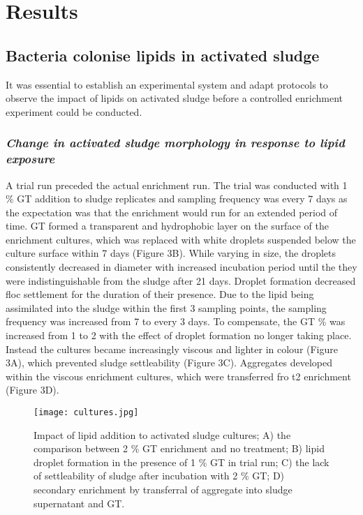 \documentclass{article}
\begin{document}
\newpage
\section{Results}

\subsection{Bacteria colonise lipids in activated sludge}
It was essential to establish an experimental system and adapt protocols to observe the impact of lipids on activated sludge before a controlled enrichment experiment could be conducted. 

\subsubsection{\emph{Change in activated sludge morphology in response to lipid exposure}}
A trial run preceded the actual enrichment run. The trial was conducted with 1 \% GT  addition to sludge replicates and sampling frequency was every 7 days as the expectation was that the enrichment would run for an extended period of time. GT formed a transparent and hydrophobic layer on the surface of the enrichment cultures, which was replaced with white droplets suspended below the culture surface within 7 days (Figure 3B). While varying in size, the droplets consistently decreased in diameter with increased incubation period until the they were indistinguishable from the sludge after 21 days. Droplet formation decreased floc settlement for the duration of their presence. 
Due to the lipid being assimilated into the sludge within the first 3 sampling points, the sampling frequency was increased from 7 to every 3 days. To compensate, the GT \% was increased from 1 to 2 with the effect of droplet formation no longer taking place. Instead the cultures became increasingly viscous and lighter in colour (Figure 3A), which prevented sludge settleability (Figure 3C). Aggregates developed within the viscous enrichment cultures, which were transferred fro t2 enrichment (Figure 3D).  
\begin{figure}
\texttt{[image: cultures.jpg]}
\caption{Impact of lipid addition to activated sludge cultures; A) the comparison between 2 \% GT enrichment and no treatment; B) lipid droplet formation in the presence of 1 \% GT in trial run; C) the lack of settleability of sludge after incubation with 2 \% GT; D) secondary enrichment by transferral of aggregate into sludge supernatant and GT.}
\end{figure}
\end{document}
